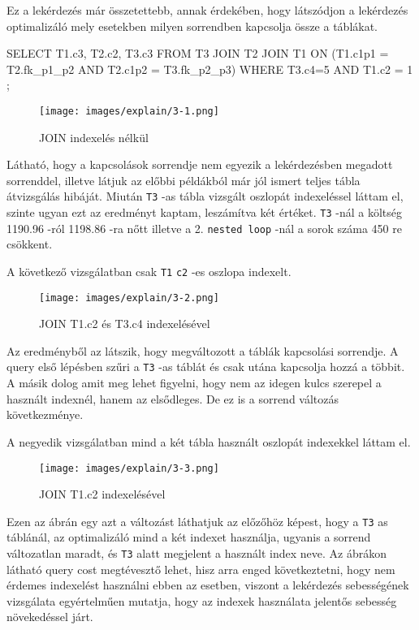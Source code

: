 
Ez a lekérdezés már összetettebb, annak érdekében, hogy látszódjon a lekérdezés optimalizáló mely esetekben milyen sorrendben kapcsolja össze a táblákat.
\begin{python}
SELECT T1.c3, T2.c2, T3.c3 FROM T3 JOIN T2 JOIN T1 
	ON (T1.c1p1 = T2.fk_p1_p2 AND T2.c1p2 = T3.fk_p2_p3) 
	WHERE  T3.c4=5 AND T1.c2 = 1 ;
\end{python}

\begin{figure}[h!]
\centering
\texttt{[image: images/explain/3-1.png]}
\caption{JOIN indexelés nélkül}
\label{fig:schema}
\end{figure}

Látható, hogy a kapcsolások sorrendje nem egyezik a lekérdezésben megadott sorrenddel, illetve látjuk az előbbi példákból már jól ismert teljes tábla átvizsgálás hibáját.
Miután \texttt{T3} -as tábla vizsgált oszlopát indexeléssel láttam el, szinte ugyan ezt az eredményt kaptam, leszámítva két értéket. \texttt{T3} -nál a költség 1190.96 -ról 1198.86 -ra nőtt illetve a 2. \texttt{nested loop} -nál a sorok száma 450 re csökkent.

\newpage
A következő vizsgálatban csak \texttt{T1} \texttt{c2} -es oszlopa indexelt.

\begin{figure}[h!]
\centering
\texttt{[image: images/explain/3-2.png]}
\caption{JOIN T1.c2 és T3.c4 indexelésével}
\label{fig:schema}
\end{figure}

Az eredményből az látszik, hogy megváltozott a táblák kapcsolási sorrendje. A query első lépésben szűri a \texttt{T3} -as táblát és csak utána kapcsolja hozzá a többit. A másik dolog amit meg lehet figyelni, hogy nem az idegen kulcs szerepel a használt indexnél, hanem az elsődleges. De ez is a sorrend változás következménye.

A negyedik vizsgálatban mind a két tábla használt oszlopát indexekkel láttam el.
\begin{figure}[h!]
\centering
\texttt{[image: images/explain/3-3.png]}
\caption{JOIN T1.c2 indexelésével}
\label{fig:schema}
\end{figure}

Ezen az ábrán egy azt a változást láthatjuk az előzőhöz képest, hogy a \texttt{T3} as táblánál, az optimalizáló mind a két indexet használja, ugyanis a sorrend változatlan maradt, és \texttt{T3} alatt megjelent a használt index neve.
Az ábrákon látható query cost megtévesztő lehet, hisz arra enged következtetni, hogy nem érdemes indexelést használni ebben az esetben, viszont a lekérdezés sebességének vizsgálata egyértelműen mutatja, hogy az indexek használata jelentős sebesség növekedéssel járt. 
